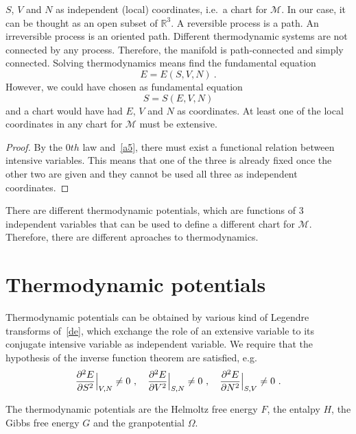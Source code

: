     $S$, $V$ and $N$ as independent (local) coordinates, i.e.~a chart for $\mathcal M$. In our case, it can be thought as an open subset of $\mathbb R^3$. A reversible process is a path. An irreversible process is an oriented path. Different thermodynamic systems are not connected by any process. Therefore, the manifold is path-connected and simply connected. Solving thermodynamics means find the fundamental equation 
    \begin{equation*}
        E = E(S, V, N) ~.
    \end{equation*}
    However, we could have chosen as fundamental equation 
    \begin{equation*}
        S = S(E, V, N) 
    \end{equation*}
    and a chart would have had $E$, $V$ and $N$ as coordinates. At least one of the local coordinates in any chart for $\mathcal M$ must be extensive. 
    \begin{proof}
        By the $0th$ law and~\eqref{a5}, there must exist a functional relation between intensive variables. This means that one of the three is already fixed once the other two are given and they cannot be used all three as independent coordinates.
    \end{proof}

    There are different thermodynamic potentials, which are functions of $3$ independent variables that can be used to define a different chart for $\mathcal M$. Therefore, there are different aproaches to thermodynamics.

\chapter{Thermodynamic potentials}

    Thermodynamic potentials can be obtained by various kind of Legendre transforms of~\eqref{de}, which exchange the role of an extensive variable to its conjugate intensive variable as independent variable. We require that the hypothesis of the inverse function theorem are satisfied, e.g. 
    \begin{equation*}
        \frac{\partial^2 E}{\partial S^2} \Big \vert_{V,N} \neq 0 ~, \quad \frac{\partial^2 E}{\partial V^2} \Big \vert_{S,N} \neq 0 ~, \quad \frac{\partial^2 E}{\partial N^2} \Big \vert_{S, V} \neq 0 ~.
    \end{equation*}

    The thermodynamic potentials are the Helmoltz free energy $F$, the entalpy $H$, the Gibbs free energy $G$ and the granpotential $\Omega$.

